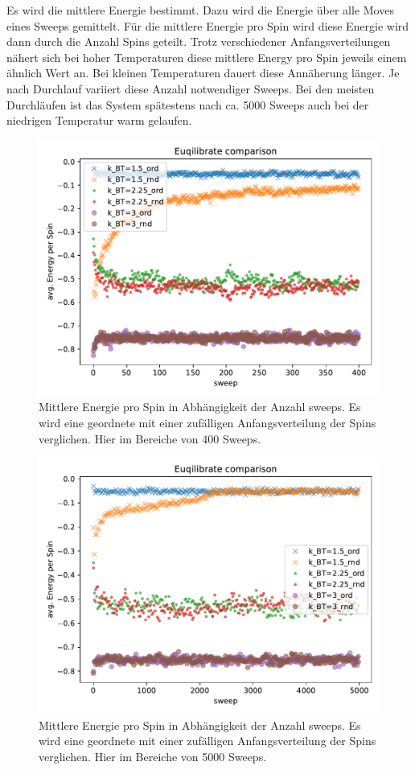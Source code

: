   Es wird die mittlere Energie bestimmt. Dazu wird die Energie über alle Moves eines Sweeps gemittelt. 
  Für die mittlere Energie pro Spin wird diese Energie wird dann durch die Anzahl Spins geteilt.
  Trotz verschiedener Anfangsverteilungen nähert sich bei hoher Temperaturen diese mittlere Energy pro Spin jeweils einem ähnlich Wert an.
  Bei kleinen Temperaturen dauert diese Annäherung länger. 
  Je nach Durchlauf variiert diese Anzahl notwendiger Sweeps. Bei den meisten Durchläufen ist das System spätestens nach ca. 5000 Sweeps auch bei der niedrigen Temperatur warm gelaufen.
  \begin{figure}
    \centering
    \includegraphics[width=.9\textwidth]{images/av_energy2.pdf}
    \caption{Mittlere Energie pro Spin in Abhängigkeit der Anzahl sweeps. Es wird eine geordnete mit einer zufälligen Anfangsverteilung der Spins verglichen. Hier im Bereiche von 400 Sweeps.}
  \end{figure}
  \begin{figure}
    \centering
    \includegraphics[width=.9\textwidth]{images/av_energy3.pdf}
    \caption{Mittlere Energie pro Spin in Abhängigkeit der Anzahl sweeps. Es wird eine geordnete mit einer zufälligen Anfangsverteilung der Spins verglichen. Hier im Bereiche von 5000 Sweeps.}
  \end{figure}
